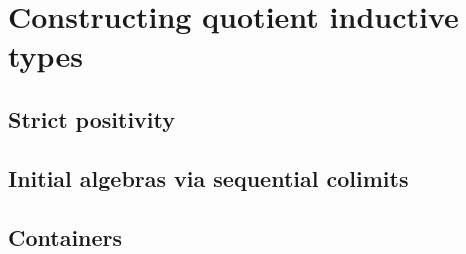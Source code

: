\chapter{Constructing quotient inductive types}

\section{Strict positivity}

\section{Initial algebras via sequential colimits}

\section{Containers}

